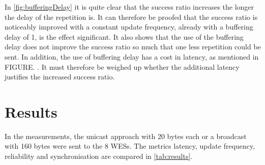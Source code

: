 In \cref{fig:bufferingDelay} it is quite clear that the success ratio increases the longer the delay of the repetition is.
It can therefore be proofed that the success ratio is noticeably improved with a constant update frequency, 
already with a buffering delay of 1, is the effect significant. 
It also shows that the use of the buffering delay does not improve the success ratio so much 
that one less repetition could be sent.
In addition, the use of buffering delay has a cost in latency, as mentioned in FIGURE. .
It must therefore be weighed up whether the additional latency justifies the increased success ratio.





\section{Results}

In the measurements, the unicast approach with 20 bytes each or a broadcast with 160 bytes were sent to the 8 WESs.
The metrics latency, update frequency, reliability and synchronisation are compared in \cref{tab:results}.

